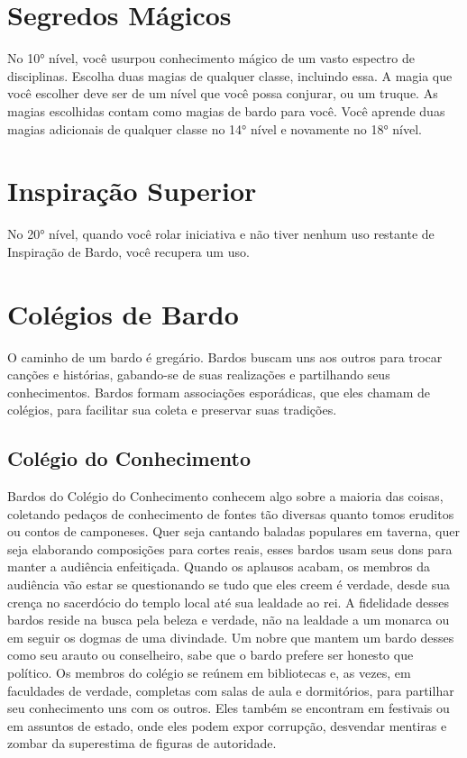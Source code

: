 \documentclass{RPG_Adventure}[2021/10/20]
\begin{document}
\section*{Segredos Mágicos}%

No 10° nível, você usurpou conhecimento mágico de um vasto espectro de
disciplinas. Escolha duas magias de qualquer classe, incluindo essa. A magia que
você escolher deve ser de um nível que você possa conjurar, ou um truque.
As magias escolhidas contam como magias de bardo para você.
Você aprende duas magias adicionais de qualquer classe no 14° nível e novamente
no 18° nível.

\section*{Inspiração Superior}%

No 20° nível, quando você rolar iniciativa e não tiver nenhum uso restante de
Inspiração de Bardo, você recupera um uso.

\section*{Colégios de Bardo}%

O caminho de um bardo é gregário. Bardos buscam uns aos outros para trocar
canções e histórias, gabando-se de suas realizações e partilhando seus
conhecimentos.
Bardos formam associações esporádicas, que eles chamam de colégios, para
facilitar sua coleta e preservar suas tradições.

\subsection*{Colégio do Conhecimento}%
\label{sub:colegio_do_conhecimento}

Bardos do Colégio do Conhecimento conhecem algo sobre a maioria das coisas,
coletando pedaços de conhecimento de fontes tão diversas quanto tomos eruditos
ou contos de camponeses. Quer seja cantando baladas populares em taverna, quer
seja elaborando composições para cortes reais, esses bardos usam seus dons para
manter a audiência enfeitiçada. Quando os aplausos acabam, os membros da
audiência vão estar se questionando se tudo que eles creem é verdade, desde sua
crença no sacerdócio do templo local até sua lealdade ao rei.
A fidelidade desses bardos reside na busca pela beleza e verdade, não na
lealdade a um monarca ou em seguir os dogmas de uma divindade. Um nobre que
mantem um bardo desses como seu arauto ou conselheiro, sabe que o bardo prefere
ser honesto que político.
Os membros do colégio se reúnem em bibliotecas e, as vezes, em faculdades de
verdade, completas com salas de aula e dormitórios, para partilhar seu
conhecimento uns com os outros. Eles também se encontram em festivais ou em
assuntos de estado, onde eles podem expor corrupção, desvendar mentiras e zombar
da superestima de figuras de autoridade.
\end{document}
